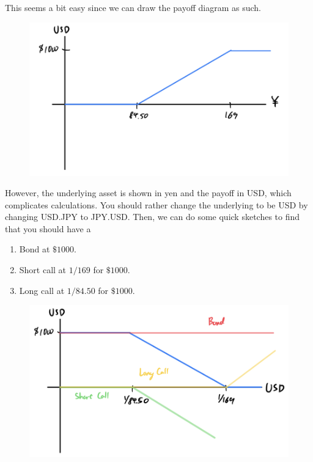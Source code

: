 \documentclass{article}
\begin{document}
  \begin{solution}
    This seems a bit easy since we can draw the payoff diagram as such. 
    \begin{figure}[H]
      \centering 
      \includegraphics[scale=0.2]{img/ex1-23-1.png}
      \caption{} 
      \label{fig:ex1-23-1}
    \end{figure}
    However, the underlying asset is shown in yen and the payoff in USD, which complicates calculations. You should rather change the underlying to be USD by changing USD.JPY to JPY.USD. Then, we can do some quick sketches to find that you should have a 
    \begin{enumerate}
      \item Bond at $\$1000$. 
      \item Short call at $1/169$ for $\$1000$. 
      \item Long call at $1/84.50$ for $\$1000$.
    \end{enumerate}
    \begin{figure}[H]
      \centering 
      \includegraphics[scale=0.2]{img/ex1-23-2.png}
      \caption{} 
      \label{fig:ex1-23-2}
    \end{figure}
  \end{solution}
\end{document}
